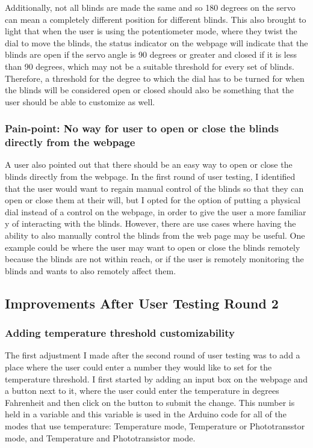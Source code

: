 \documentclass[10pt,twocolumn]{article}
\begin{document}
Additionally, not all blinds are made the same and so 180 degrees on the servo can mean a completely different position for different blinds. This also brought to light that when the user is using the potentiometer mode, where they twist the dial to move the blinds, the status indicator on the webpage will indicate that the blinds are open if the servo angle is 90 degrees or greater and closed if it is less than 90 degrees, which may not be a suitable threshold for every set of blinds. Therefore, a threshold for the degree to which the dial has to be turned for when the blinds will be considered open or closed should also be something that the user should be able to customize as well. 

\subsubsection{Pain-point: No way for user to open or close the blinds directly from the webpage}
A user also pointed out that there should be an easy way to open or close the blinds directly from the webpage. In the first round of user testing, I identified that the user would want to regain manual control of the blinds so that they can open or close them at their will, but I opted for the option of putting a physical dial instead of a control on the webpage, in order to give the user a more familiar y of interacting with the blinds. However, there are use cases where having the ability to also manually control the blinds from the web page may be useful. One example could be where the user may want to open or close the blinds remotely because the blinds are not within reach, or if the user is remotely monitoring the blinds and wants to also remotely affect them.

\subsection{Improvements After User Testing Round 2}
\subsubsection{Adding temperature threshold customizability}
The first adjustment I made after the second round of user testing was to add a place where the user could enter a number they would like to set for the temperature threshold. I first started by adding an input box on the webpage and a button next to it, where the user could enter the temperature in degrees Fahrenheit and then click on the button to submit the change. This number is held in a variable and this variable  is used in the Arduino code for all of the modes that use temperature: Temperature mode, Temperature or Phototransstor mode, and Temperature and Phototransistor mode.
\end{document}
